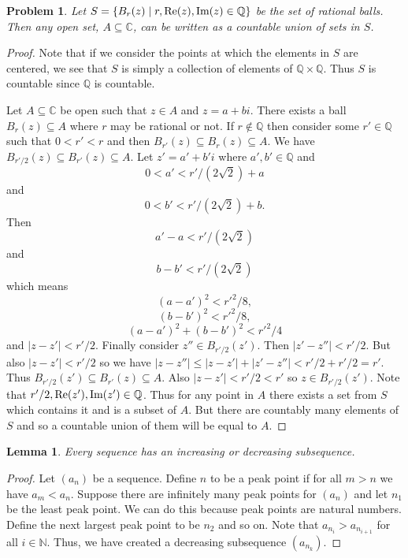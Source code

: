 \documentclass{article}
\newtheorem{problem}{Problem}
\newtheorem{lemma}{Lemma}
\begin{document}
\begin{flushleft}
\begin{problem}
Let $S = \{B_r(z) \mid r, \textup{Re}(z), \textup{Im}(z) \in \mathbb{Q}\}$ be the set of rational balls. Then any open set, $A \subseteq \mathbb{C}$, can be written as a countable union of sets in $S$.
\end{problem}
\begin{proof}
Note that if we consider the points at which the elements in $S$ are centered, we see that $S$ is simply a collection of elements of $\mathbb{Q} \times \mathbb{Q}$. Thus $S$ is countable since $\mathbb{Q}$ is countable.\newline

Let $A \subseteq \mathbb{C}$ be open such that $z \in A$ and $z = a + bi$. There exists a ball $B_r(z) \subseteq A$ where $r$ may be rational or not. If $r \notin \mathbb{Q}$ then consider some $r' \in \mathbb{Q}$ such that $0 < r' < r$ and then $B_{r'}(z) \subseteq B_r(z) \subseteq A$. We have $B_{r'/2}(z) \subseteq B_{r'}(z) \subseteq A$. Let $z' = a' + b'i$ where $a', b' \in \mathbb{Q}$ and
\[
0 < a' < r'/(2 \sqrt{2}) + a
\]
and
\[
0 < b' < r'/(2 \sqrt{2}) + b.
\]
Then
\[
a'-a < r'/(2 \sqrt{2})
\]
and
\[
b-b' < r'/(2 \sqrt{2})
\]
which means
\[
(a-a')^2 < r'^2/8,
\]
\[
(b-b')^2 < r'^2/8,
\]
\[
(a-a')^2 + (b-b')^2 < r'^2/4
\]
and $|z-z'| < r'/2$. Finally consider $z'' \in B_{r'/2}(z')$. Then $|z'-z''| < r'/2$. But also $|z -z'| < r'/2$ so we have $|z-z''| \leq |z-z'| + |z'-z''| < r'/2 + r'/2 = r'$. Thus $B_{r'/2}(z') \subseteq B_{r'}(z) \subseteq A$. Also $|z-z'| < r'/2 < r'$ so $z \in B_{r'/2}(z')$. Note that $r'/2, \textup{Re}(z'), \textup{Im}(z') \in \mathbb{Q}$. Thus for any point in $A$ there exists a set from $S$ which contains it and is a subset of $A$. But there are countably many elements of $S$ and so a countable union of them will be equal to $A$.
\end{proof}

\begin{lemma}
Every sequence has an increasing or decreasing subsequence.
\end{lemma}
\begin{proof}
Let $(a_n)$ be a sequence. Define $n$ to be a peak point if for all $m>n$ we have $a_m < a_n$. Suppose there are infinitely many peak points for $(a_n)$ and let $n_1$ be the least peak point. We can do this because peak points are natural numbers. Define the next largest peak point to be $n_2$ and so on. Note that $a_{n_i} > a_{n_{i+1}}$ for all $i \in \mathbb{N}$. Thus, we have created a decreasing subsequence $(a_{n_k})$.\newline


\end{proof}
\end{flushleft}
\end{document}
